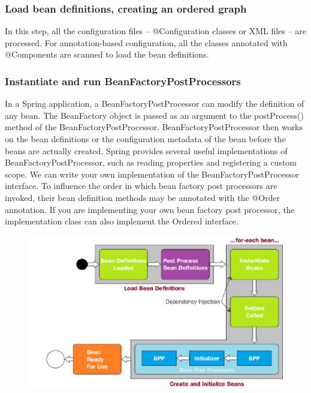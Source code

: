 \documentclass{scrartcl}
\begin{document}
\subsubsection{Load bean definitions, creating an ordered graph}
    In this step, all the configuration files – @Configuration classes or XML files – are processed. For annotation-based configuration, all the classes annotated with @Components are scanned to load the bean definitions.
\subsubsection{Instantiate and run BeanFactoryPostProcessors}
    In a Spring application, a BeanFactoryPostProcessor can modify the definition of any bean.
    The BeanFactory object is passed as an argument to the postProcess() method of the BeanFactoryPostProcessor. BeanFactoryPostProcessor then works on the bean definitions or the configuration metadata of the bean before the beans are actually created.
    Spring provides several useful implementations of BeanFactoryPostProcessor, such as reading properties and registering a custom scope. We can write your own implementation of the BeanFactoryPostProcessor interface. To influence the order in which bean factory post processors are invoked, their bean definition methods may be annotated with the @Order annotation. If you are implementing your own bean factory post processor, the implementation class can also implement the Ordered interface.

    \begin{figure}
        \centering
        \includegraphics[width=1\linewidth]{bean-lifecycle-3}
        \caption{}
        \label{fig:bean-lifecycle-1}
    \end{figure}
\end{document}
